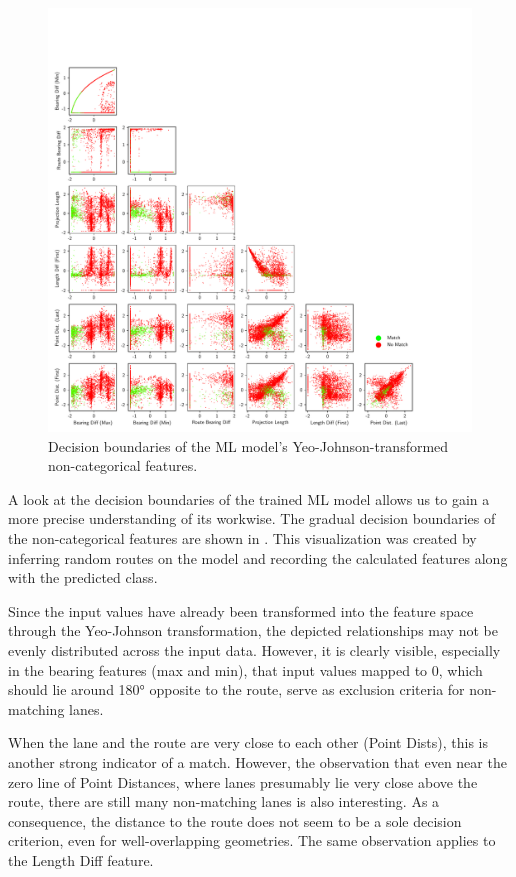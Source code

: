 \begin{figure}[!t]
\centering 
\includegraphics[width=\linewidth,bb=0 0 760 760]{images/decision-boundaries.pdf}
\caption{Decision boundaries of the ML model's Yeo-Johnson-transformed non-categorical features.}
\label{fig:ml-model-decision-boundaries}
\end{figure}

A look at the decision boundaries of the trained ML model allows us to gain a more precise understanding of its workwise. The gradual decision boundaries of the non-categorical features are shown in . This visualization was created by inferring random routes on the model and recording the calculated features along with the predicted class. 

Since the input values have already been transformed into the feature space through the Yeo-Johnson transformation, the depicted relationships may not be evenly distributed across the input data. However, it is clearly visible, especially in the bearing features (max and min), that input values mapped to 0, which should lie around 180° opposite to the route, serve as exclusion criteria for non-matching lanes.

When the lane and the route are very close to each other (Point Dists), this is another strong indicator of a match. However, the observation that even near the zero line of Point Distances, where lanes presumably lie very close above the route, there are still many non-matching lanes is also interesting. As a consequence, the distance to the route does not seem to be a sole decision criterion, even for well-overlapping geometries. The same observation applies to the Length Diff feature.


